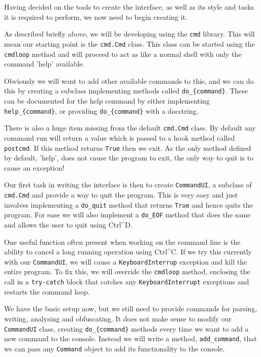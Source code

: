 \documentclass{report}
\begin{document}
Having decided on the tools to create the interface, as well as its style and tasks it is required to perform, we now need to begin creating it.

As described briefly above, we will be developing using the \texttt{cmd} library. This will mean our starting point is the \texttt{cmd.Cmd} class.
This class can be started using the \texttt{cmdloop} method and will proceed to act as like a normal shell with only the command 'help' available.

Obviously we will want to add other available commands to this, and we can do this by creating a subclass implementing methods called
\texttt{do\_\{command\}}. These can be documented for the help command by either implementing \texttt{help\_\{command\}}, or providing
\texttt{do\_\{command\}} with a docstring.

There is also a huge item missing from the default \texttt{cmd.Cmd} class. By default any command run will return a value which is passed to a
hook method called \texttt{postcmd}. If this method returns \texttt{True} then we exit. As the only method defined by default, 'help', does not
cause the program to exit, the only way to quit is to cause an exception!

Our first task in writing the interface is then to create \texttt{CommandUI}, a subclass of \texttt{cmd.Cmd} and provide a way to quit the program.
This is very easy and just involves implementing a \texttt{do\_quit} method that returns \texttt{True} and hence quits the program. For ease we will
also implement a \texttt{do\_EOF} method that does the same and allows the user to quit using Ctrl\^{}D.

One useful function often present when working on the command line is the ability to cancel a long running operation using Ctrl\^{}C. If we try this
currently with our \texttt{CommandUI}, we will cause a \texttt{KeyboardInterrup} exception and kill the entire program. To fix this, we will
override the \texttt{cmdloop} method, enclosing the call in a \texttt{try-catch} block that catches any \texttt{KeyboardInterrupt} exceptions and
restarts the command loop.

We have the basic setup now, but we still need to provide commands for parsing, writing, analysing and obfuscating. It does not make sense to modify
our \texttt{CommandUI} class, creating \texttt{do\_\{command\}} methods every time we want to add a new command to the console. Instead we will write
a method, \texttt{add\_command}, that we can pass any \texttt{Command} object to add its functionality to the console.
\end{document}

